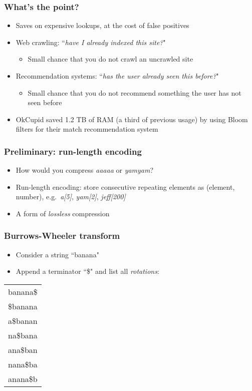 \documentclass{beamer}
\begin{document}
\begin{frame}
 \frametitle{What's the point?}
 \begin{itemize}
  \item Saves on expensive lookups, at the cost of false positives
  \item Web crawling: ``\emph{have I already indexed this site?}"
   \begin{itemize}
    \item Small chance that you do not crawl an uncrawled site
   \end{itemize}
  \item Recommendation systems: ``\emph{has the user already seen this
        before?}"
   \begin{itemize}
    \item Small chance that you do not recommend something the user has
          not seen before
   \end{itemize}
  \item OkCupid saved 1.2 TB of RAM (a third of previous usage) by using
        Bloom filters for their match recommendation system
 \end{itemize}
\end{frame}

\begin{frame}
 \frametitle{Preliminary: run-length encoding}
 \begin{itemize}
  \item How would you compress \emph{aaaaa} or \emph{yamyam}?
  \item Run-length encoding: store consecutive repeating elements as
        (element, number), e.g.\ \emph{a[5]}, \emph{yam[2]},
        \emph{jeff[200]}
  \item A form of \emph{lossless} compression
 \end{itemize}
\end{frame}

\begin{frame}
 \frametitle{Burrows-Wheeler transform}
 \begin{itemize}
  \item Consider a string ``banana"
  \item Append a terminator ``\$" and list all \emph{rotations}:
 \end{itemize}
 \begin{center}
  \begin{tabular}{l}
   banana\$ \\
   \$banana \\
   a\$banan \\
   na\$bana \\
   ana\$ban \\
   nana\$ba \\
   anana\$b \\
  \end{tabular}
 \end{center}
\end{frame}
\end{document}
